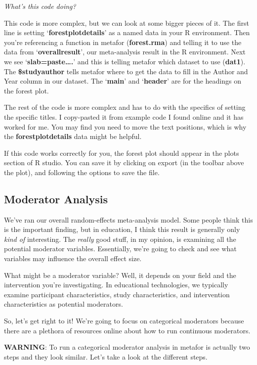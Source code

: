 \documentclass[
]{book}
\begin{document}
\emph{What's this code doing?}

This code is more complex, but we can look at some bigger pieces of it. The first line is setting `\textbf{forestplotdetails}' as a named data in your R environment. Then you're referencing a function in metafor (\textbf{forest.rma}) and telling it to use the data from `\textbf{overallresult}', our meta-analysis result in the R environment. Next we see `\textbf{slab=paste\ldots.}' and this is telling metafor which dataset to use (\textbf{dat1}). The \textbf{\$studyauthor} tells metafor where to get the data to fill in the Author and Year column in our dataset. The `\textbf{main}' and `\textbf{header}' are for the headings on the forest plot.

The rest of the code is more complex and has to do with the specifics of setting the specific titles. I copy-pasted it from example code I found online and it has worked for me. You may find you need to move the text positions, which is why the \textbf{forestplotdetails} data might be helpful.

If this code works correctly for you, the forest plot should appear in the plots section of R studio. You can save it by clicking on export (in the toolbar above the plot), and following the options to save the file.

\hypertarget{moderator-analysis}{%
\subsection{Moderator Analysis}\label{moderator-analysis}}

We've ran our overall random-effects meta-analysis model. Some people think this is the important finding, but in education, I think this result is generally only \emph{kind of} interesting. The \emph{really} good stuff, in my opinion, is examining all the potential moderator variables. Essentially, we're going to check and see what variables may influence the overall effect size.

What might be a moderator variable? Well, it depends on your field and the intervention you're investigating. In educational technologies, we typically examine participant characteristics, study characteristics, and intervention characteristics as potential moderators.

So, let's get right to it! We're going to focus on categorical moderators because there are a plethora of resources online about how to run continuous moderators.

\textbf{WARNING}: To run a categorical moderator analysis in metafor is actually two steps and they look similar. Let's take a look at the different steps.
\end{document}
